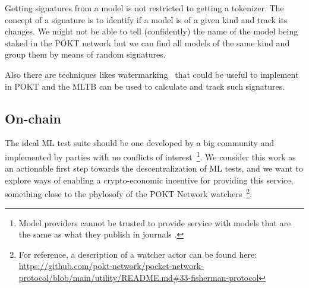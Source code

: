 Getting signatures from a model is not restricted to getting a tokenizer. 
The concept of a signature is to identify if a model is of a given kind and track its changes. 
We might not be able to tell (confidently) the name of the model being staked in the POKT network but we can find all models of the same kind and group them by means of random signatures.

Also there are techniques likes watermarking~\cite{kirchenbauer2023watermark} that could be useful to implement in POKT and the \gls{MLTB} can be used to calculate and track such signatures.

\subsection*{On-chain}

The ideal \gls{ML} test suite should be one developed by a big community and implemented by parties with no conflicts of interest~\footnote{Model providers cannot be trusted to provide service with models that are the same as what they publish in journals \cite{chen_how_2023}.}. 
We consider this work as an actionable first step towards the descentralization of \gls{ML} tests, and we want to explore ways of enabling a crypto-economic incentive for providing this service, something close to the phylosofy of the POKT Network watchers~\footnote{For reference, a description of a watcher actor can be found here: \url{https://github.com/pokt-network/pocket-network-protocol/blob/main/utility/README.md\#33-fisherman-protocol}}.
